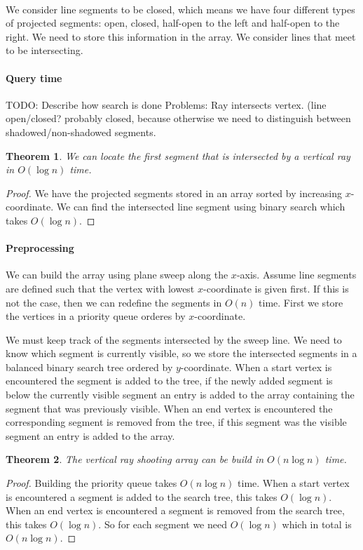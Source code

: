 \documentclass[10pt,a4paper,final,oneside,openany,article]{memoir}
\newtheorem{rayshooting}{Theorem}
\begin{document}
\paragraph{}
We consider line segments to be closed, which means we have four different types of projected segments: open, closed, half-open to the left and half-open to the right. We need to store this information in the array. We consider lines that meet to be intersecting. 

\paragraph{Query time}
TODO: Describe how search is done
Problems:
Ray intersects vertex. (line open/closed? probably closed, because otherwise we need to distinguish between shadowed/non-shadowed segments.

\begin{rayshooting}
  We can locate the first segment that is intersected by a vertical ray in $O(\log n)$ time.
\end{rayshooting}
\begin{proof}
  We have the projected segments stored in an array sorted by increasing $x$-coordinate. We can find the intersected line segment using binary search which takes $O(\log n)$.
\end{proof}


\paragraph{Preprocessing}
We can build the array using plane sweep along the $x$-axis. Assume line segments are defined such that the vertex with lowest $x$-coordinate is given first. If this is not the case, then we can redefine the segments in $O(n)$ time. First we store the vertices in a priority queue orderes by $x$-coordinate.

We must keep track of the segments intersected by the sweep line. We need to know which segment is currently visible, so we store the intersected segments in a balanced binary search tree ordered by $y$-coordinate.
When a start vertex is encountered the segment is added to the tree, if the newly added segment is below the currently visible segment an entry is added to the array containing the segment that was previously visible.
When an end vertex is encountered the corresponding segment is removed from the tree, if this segment was the visible segment an entry is added to the array.

\begin{rayshooting}
  The vertical ray shooting array can be build in $O(n \log n)$ time.
\end{rayshooting}
\begin{proof}
  Building the priority queue takes $O( n \log n)$ time. 
  When a start vertex is encountered a segment is added to the search tree, this takes $O(\log n)$. When an end vertex is encountered a segment is removed from the search tree, this takes $O(\log n)$. So for each segment we need $O(\log n)$ which in total is $O(n \log n)$.
\end{proof}
\end{document}
